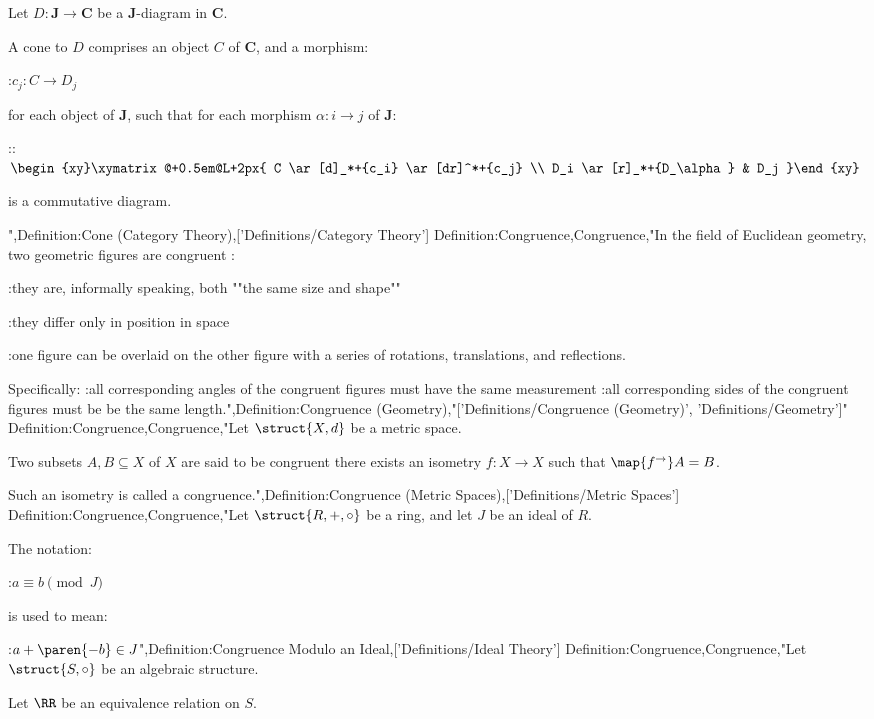 Let $D: \mathbf J \to \mathbf C$ be a $\mathbf J$-diagram in $\mathbf C$.


A cone to $D$ comprises an object $C$ of $\mathbf C$, and a morphism:

:$c_j: C \to D_j$

for each object of $\mathbf J$, such that for each morphism $\alpha: i \to j$ of $\mathbf J$:

::$\begin{xy}\xymatrix@+0.5em@L+2px{
 C
  \ar[d]_*+{c_i}
  \ar[dr]^*+{c_j}

\\
 D_i
  \ar[r]_*+{D_\alpha}
&
 D_j
}\end{xy}$

is a commutative diagram.

",Definition:Cone (Category Theory),['Definitions/Category Theory']
Definition:Congruence,Congruence,"In the field of Euclidean geometry, two geometric figures are congruent :

:they are, informally speaking, both ""the same size and shape""

:they differ only in position in space

:one figure can be overlaid on the other figure with a series of rotations, translations, and reflections.


Specifically:
:all corresponding angles of the congruent figures must have the same measurement
:all corresponding sides of the congruent figures must be be the same length.",Definition:Congruence (Geometry),"['Definitions/Congruence (Geometry)', 'Definitions/Geometry']"
Definition:Congruence,Congruence,"Let $\struct {X, d}$ be a metric space.

Two subsets $A, B \subseteq X$ of $X$ are said to be congruent  there exists an isometry $f: X \to X$ such that $\map {f^\to} A = B$.

Such an isometry is called a congruence.",Definition:Congruence (Metric Spaces),['Definitions/Metric Spaces']
Definition:Congruence,Congruence,"Let $\struct {R, +, \circ}$ be a ring, and let $J$ be an ideal of $R$.


The notation:

:$a \equiv b \pmod J$

is used to mean:

:$a + \paren {-b} \in J$",Definition:Congruence Modulo an Ideal,['Definitions/Ideal Theory']
Definition:Congruence,Congruence,"Let $\struct {S, \circ}$ be an algebraic structure.

Let $\RR$ be an equivalence relation on $S$.


